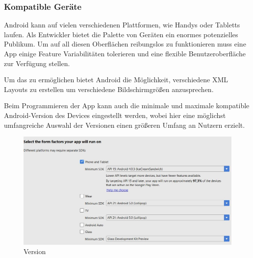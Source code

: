 \subsubsection{Kompatible Geräte}
\label{subsec:device-compability}

Android kann auf vielen verschiedenen Plattformen, wie Handys oder Tabletts laufen.
Als Entwickler bietet die Palette von Geräten ein enormes potenzielles Publikum.
Um auf all diesen Oberflächen reibungslos zu funktionieren muss eine App einige Feature Variabilitäten tolerieren und eine 
flexible Benutzeroberfläche zur Verfügung stellen. 

Um das zu ermöglichen bietet Android die Möglichkeit, verschiedene XML Layouts zu erstellen um verschiedene Bildschirmgrößen anzusprechen.

Beim Programmieren der App kann auch die minimale und maximale kompatible Android-Version des Devices eingestellt werden, wobei hier eine möglichst umfangreiche Auswahl der Versionen einen größeren Umfang an Nutzern erzielt.

\begin{figure}[!htb]\centering
	\includegraphics[width=1.0 \textwidth]{images/MinMaxVers}
	\caption{Version}\label{Fig:min-max Version}
\end{figure}



\clearpage %